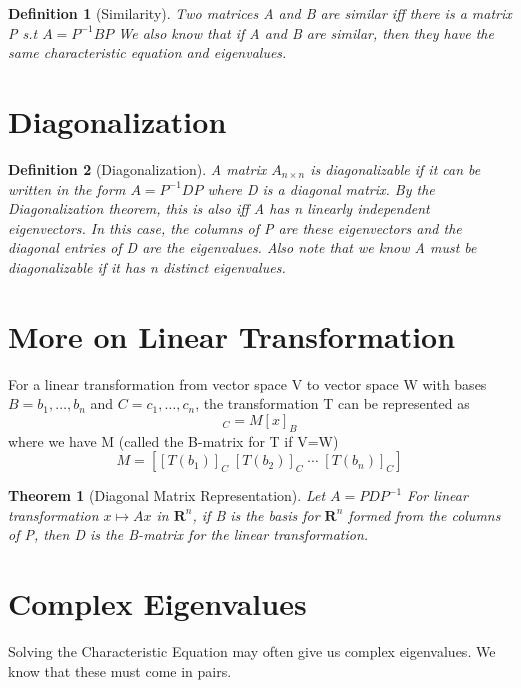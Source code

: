 \documentclass[12pt]{report}
\newtheorem{thm}{Theorem}
\newtheorem{dfn}{Definition}
\newcommand{\mtx}[3]{$#1_{#2\times #3}$}
\begin{document}
\begin{dfn}[Similarity]
Two matrices A and B are similar iff there is a matrix P s.t $A=P^{-1}BP$
We also know that if A and B are similar, then they have the same characteristic equation and eigenvalues.
\end{dfn}

\section{Diagonalization}

\begin{dfn}[Diagonalization]
A matrix \mtx{A}{n}{n} is diagonalizable if it can be written in the form $A=P^{-1}DP$ where D is a diagonal matrix.
By the Diagonalization theorem, this is also iff A has n linearly independent eigenvectors. In this case, the columns of P are these eigenvectors and the diagonal entries of D are the eigenvalues.
Also note that we know A must be diagonalizable if it has n distinct eigenvalues.
\end{dfn}

\section{More on Linear Transformation}

For a linear transformation from vector space V to vector space W with bases $B={b_1, \ldots, b_n}$ and $C={c_1, \ldots, c_n}$, the transformation T can be represented as 
\begin{equation}
[T(x)]_C = M[x]_B
\end{equation}
where we have M (called the B-matrix for T if V=W)
\begin{equation}
M = [[T(b_1)]_C \; [T(b_2)]_C \; \cdots \; [T(b_n)]_C]
\end{equation}

\begin{thm}[Diagonal Matrix Representation]
Let $A = PDP^{-1}$
For linear transformation $x \mapsto Ax$ in $\mathbf{R}^n$, if B is the basis for $\mathbf{R}^n$ formed from the columns of P, then D is the B-matrix for the linear transformation.
\end{thm}

\section{Complex Eigenvalues}

Solving the Characteristic Equation may often give us complex eigenvalues. We know that these must come in pairs.
\end{document}
